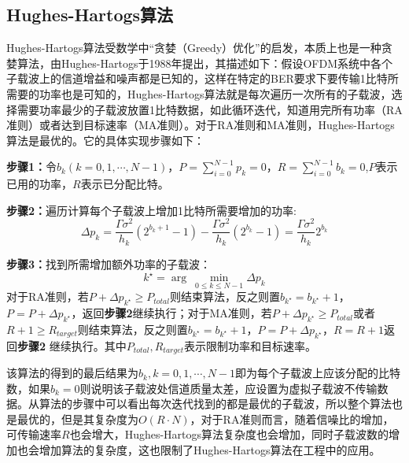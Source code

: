 \subsection{Hughes-Hartogs算法}
Hughes-Hartogs算\cite{hughes1989ensemble}法受数学中“贪婪（Greedy）优化”的启发，本质上也是一种贪婪算法，由Hughes-Hartogs于1988年提出，其描述如下：假设OFDM系统中各个子载波上的信道增益和噪声都是已知的，这样在特定的BER要求下要传输1比特所需要的功率也是可知的，Hughes-Hartogs算法就是每次遍历一次所有的子载波，选择需要功率最少的子载波放置1比特数据，如此循环迭代，知道用完所有功率（RA准则）或者达到目标速率（MA准则）。对于RA准则和MA准则，Hughes-Hartogs算法是最优的。它的具体实现步骤如下：
\begin{description}
\item{\bf{步骤1：}}令$b_k(k=0,1,\cdots,N-1)$，$P=\sum_{i=0}^{N-1}p_k=0$，$R=\sum_{i=0}^{N-1}b_k=0$,$P$表示已用的功率，$R$表示已分配比特。
\item{\bf{步骤2：}}遍历计算每个子载波上增加1比特所需要增加的功率:
\begin{equation}
\Delta p_k=\frac{\Gamma\sigma^2}{h_k}(2^{b_k+1}-1)-\frac{\Gamma\sigma^2}{h_k}(2^{b_k}-1)=\frac{\Gamma\sigma^2}{h_k}2^{b_k}
\end{equation}
\item{\bf{步骤3：}}找到所需增加额外功率的子载波：
\begin{equation}
k^{\star} = \arg\ \underset{0\leq k \leq N-1}{\min}\Delta p_k
\end{equation}
对于RA准则，若$P+\Delta p_{k^\star}\geq P_{total}$则结束算法，反之则置$b_{k^\star}=b_{k^\star}+1$，$P=P+\Delta p_{k^\star}$，返回\textbf{步骤2}继续执行；对于MA准则，若$P+\Delta p_{k^\star}\geq P_{total}$或者$R+1\geq R_{target}$则结束算法，反之则置$b_{k^\star}=b_{k^\star}+1$，$P=P+\Delta p_{k^\star}$，$R=R+1$返回\textbf{步骤2} 继续执行。其中$P_{total}, R_{target}$表示限制功率和目标速率。
\end{description}
该算法的得到的最后结果为$b_k, k=0,1,\cdots,N-1$即为每个子载波上应该分配的比特数，如果$b_k=0$则说明该子载波处信道质量太差，应设置为虚拟子载波不传输数据。从算法的步骤中可以看出每次迭代找到的都是最优的子载波，所以整个算法也是最优的，但是其复杂度为$O(R\cdot N)$，对于RA准则而言，随着信噪比的增加，可传输速率$R$也会增大，Hughes-Hartogs算法复杂度也会增加，同时子载波数的增加也会增加算法的复杂度，这也限制了Hughes-Hartogs算法在工程中的应用。
